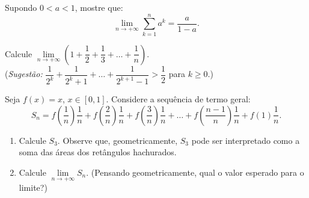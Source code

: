 \begin{exercicio}[2]
Supondo $0 < a < 1$, mostre que:
\[
\lim_{n \to +\infty} \sum_{k = 1}^{n} a^k = \dfrac{a}{1 - a}.
\]
\end{exercicio}

\begin{exercicio}[3]
Calcule $\lim\limits_{n \to +\infty} \left(1 + \dfrac{1}{2} + \dfrac{1}{3} + \dots + \dfrac{1}{n}\right)$.\\
(\textit{Sugestão:} $\dfrac{1}{2^k} + \dfrac{1}{2^k + 1} + \dots + \dfrac{1}{2^{k+1} - 1} > \dfrac{1}{2}$ para $k \ge 0$.)
\end{exercicio}

\begin{exercicio}[4]
Seja $f(x) = x$, $x \in [0, 1]$. Considere a sequência de termo geral:
\[
S_n = f\!\left(\dfrac{1}{n}\right)\dfrac{1}{n} + f\!\left(\dfrac{2}{n}\right)\dfrac{1}{n} + f\!\left(\dfrac{3}{n}\right)\dfrac{1}{n} + \dots + f\!\left(\dfrac{n - 1}{n}\right)\dfrac{1}{n} + f(1)\dfrac{1}{n}.
\]
\begin{enumerate}[label=\alph*)]
    \item Calcule $S_3$. Observe que, geometricamente, $S_3$ pode ser interpretado como a soma das áreas dos retângulos hachurados.

\begin{center}
\end{center}

    \item Calcule $\lim\limits_{n \to +\infty} S_n$. (Pensando geometricamente, qual o valor esperado para o limite?)
\end{enumerate}
\end{exercicio}

